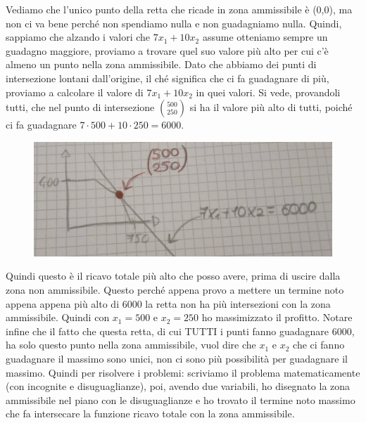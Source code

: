 \documentclass{article}
\begin{document}
Vediamo che l'unico punto della retta che ricade in zona ammissibile è (0,0), ma non ci va bene perché non spendiamo nulla e non guadagniamo nulla. Quindi, sappiamo che alzando i valori che $7x_1 + 10x_2$ assume otteniamo sempre un guadagno maggiore, proviamo a trovare quel suo valore più alto per cui c'è almeno un punto nella zona ammissibile. Dato che abbiamo dei punti di intersezione lontani dall'origine, il ché significa che ci fa guadagnare di più, proviamo a calcolare il valore di $7x_1 + 10x_2$ in quei valori. Si vede, provandoli tutti, che nel punto di intersezione $\binom{500}{250}$ si ha il valore più alto di tutti, poiché ci fa guadagnare $7\cdot500 + 10\cdot250 = 6000$.
\begin{figure}[h!]
    \centering
    \includegraphics[scale=0.3]{rettaricavototfinale.jpeg}
\end{figure}
Quindi questo è il ricavo totale più alto che posso avere, prima di uscire dalla zona non ammissibile. Questo perché appena provo a mettere un termine noto appena appena più alto di 6000 la retta non ha più intersezioni con la zona ammissibile. Quindi con $x_1 = 500$ e $x_2 = 250$ ho massimizzato il profitto. Notare infine che il fatto che questa retta, di cui TUTTI i punti fanno guadagnare 6000, ha solo questo punto nella zona ammissibile, vuol dire che $x_1$ e $x_2$ che ci fanno guadagnare il massimo sono unici, non ci sono più possibilità per guadagnare il massimo. Quindi per risolvere i problemi: scriviamo il problema matematicamente (con incognite e disuguaglianze), poi, avendo due variabili, ho disegnato la zona ammissibile nel piano con le disuguaglianze e ho trovato il termine noto massimo che fa intersecare la funzione ricavo totale con la zona ammissibile.
 
\vspace{1cm}

\end{document}
